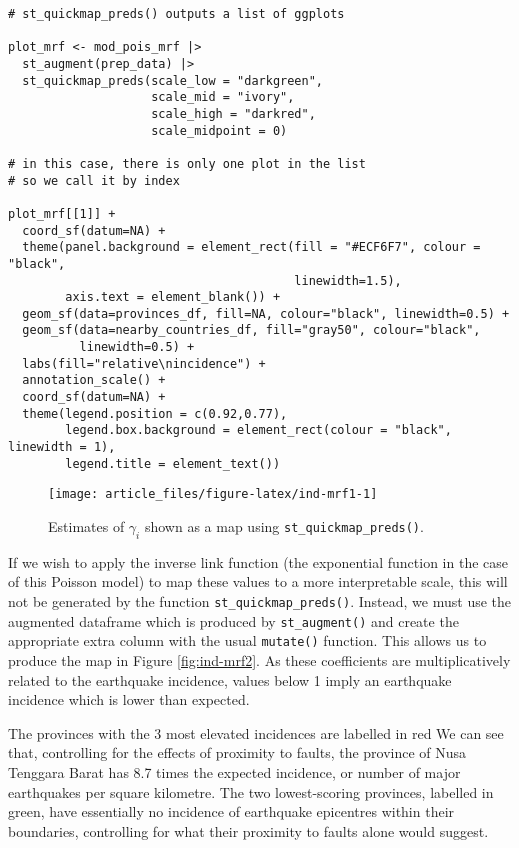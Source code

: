 \begin{verbatim}
# st_quickmap_preds() outputs a list of ggplots

plot_mrf <- mod_pois_mrf |> 
  st_augment(prep_data) |>
  st_quickmap_preds(scale_low = "darkgreen",
                    scale_mid = "ivory", 
                    scale_high = "darkred", 
                    scale_midpoint = 0)

# in this case, there is only one plot in the list
# so we call it by index

plot_mrf[[1]] +
  coord_sf(datum=NA) +
  theme(panel.background = element_rect(fill = "#ECF6F7", colour = "black", 
                                        linewidth=1.5),
        axis.text = element_blank()) +
  geom_sf(data=provinces_df, fill=NA, colour="black", linewidth=0.5) + 
  geom_sf(data=nearby_countries_df, fill="gray50", colour="black", 
          linewidth=0.5) + 
  labs(fill="relative\nincidence") +
  annotation_scale() +
  coord_sf(datum=NA) + 
  theme(legend.position = c(0.92,0.77),
        legend.box.background = element_rect(colour = "black", linewidth = 1),
        legend.title = element_text())
\end{verbatim}

\begin{figure}

{\centering \texttt{[image: article\_files/figure-latex/ind-mrf1-1]} 

}

\caption{Estimates of \(\gamma_i\) shown as a map using \texttt{st\_quickmap\_preds()}.}\label{fig:ind-mrf1}
\end{figure}

If we wish to apply the inverse link function (the exponential function in the case of this Poisson model) to map these values to a more interpretable scale, this will not be generated by the function \texttt{st\_quickmap\_preds()}. Instead, we must use the augmented dataframe which is produced by \texttt{st\_augment()} and create the appropriate extra column with the usual  \texttt{mutate()} function. This allows us to produce the map in Figure
\ref{fig:ind-mrf2}. As these coefficients are multiplicatively related
to the earthquake incidence, values below 1 imply an earthquake
incidence which is lower than expected.

The provinces with the 3 most elevated incidences are labelled in red
We can see that, controlling for the effects of proximity to
faults, the province of Nusa Tenggara Barat has 8.7 times the expected
incidence, or number of major earthquakes per square kilometre. The two
lowest-scoring provinces, labelled in green, have essentially no incidence of
earthquake epicentres within their boundaries, controlling for what their proximity to faults alone would
suggest.



